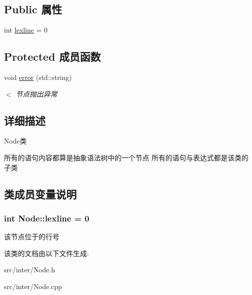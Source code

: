 \subsection*{Public 属性}
\begin{DoxyCompactItemize}
\item 
int \hyperlink{class_node_a8e50263ff9416be77e26edfbf6b926a1}{lexline} = 0
\end{DoxyCompactItemize}
\subsection*{Protected 成员函数}
\begin{DoxyCompactItemize}
\item 
void \hyperlink{class_node_aa1bb6c155277eb2c073a60c00674b8b6}{error} (std\+::string)\hypertarget{class_node_aa1bb6c155277eb2c073a60c00674b8b6}{}\label{class_node_aa1bb6c155277eb2c073a60c00674b8b6}

\begin{DoxyCompactList}\small\item\em $<$ 节点抛出异常 \end{DoxyCompactList}\end{DoxyCompactItemize}


\subsection{详细描述}
Node类 

所有的语句内容都算是抽象语法树中的一个节点 所有的语句与表达式都是该类的子类 

\subsection{类成员变量说明}
\subsubsection[{\texorpdfstring{lexline}{lexline}}]{\setlength{\rightskip}{0pt plus 5cm}int Node\+::lexline = 0}\hypertarget{class_node_a8e50263ff9416be77e26edfbf6b926a1}{}\label{class_node_a8e50263ff9416be77e26edfbf6b926a1}
该节点位于的行号 

该类的文档由以下文件生成\+:\begin{DoxyCompactItemize}
\item 
src/inter/Node.\+h\item 
src/inter/Node.\+cpp\end{DoxyCompactItemize}
